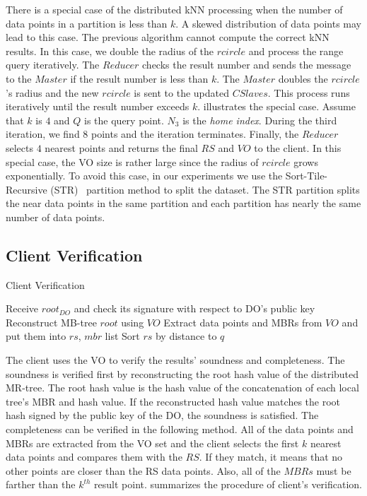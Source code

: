 There is a special case of the distributed kNN processing when the number of data points in a partition is less than $k$. A skewed distribution of data points may lead to this case. The previous algorithm cannot compute the correct kNN results. In this case, we double the radius of the $rcircle$ and process the range query iteratively. The $Reducer$ checks the result number and sends the message to the $Master$ if the result number is less than $k$. The $Master$ doubles the $rcircle$'s radius and the new $rcircle$ is sent to the updated $CSlaves$. This process runs iteratively until the result number exceeds $k$.  illustrates the special case. Assume that $k$ is $4$ and $Q$ is the query point. $N_{3}$ is the \emph{home index}. During the third iteration, we find $8$ points and the iteration terminates. Finally, the $Reducer$ selects $4$ nearest points and returns the final $RS$ and $VO$ to the client. In this special case, the VO size is rather large since the radius of $rcircle$ grows exponentially. To avoid this case, in our experiments we use the Sort-Tile-Recursive (STR)~\cite{10.1109/ICDE.1997.582015} partition method to split the dataset. The STR partition splits the near data points in the same partition and each partition has nearly the same number of data points.

\subsection{Client Verification}\label{sec:knn:client-verification}

\begin{algorithm}[t]
  \caption{Client Verification}\label{alg:knn:client-verification}
  Receive ${root}_{DO}$ and check its signature with respect to DO's public key\;
  Reconstruct MB-tree ${root}$ using $VO$\;
  Extract data points and MBRs from $VO$ and put them into $rs$, $mbr$ list\;
  Sort $rs$ by distance to $q$\;
  \;
\end{algorithm}

The client uses the VO to verify the results' soundness and completeness. The soundness is verified first by reconstructing the root hash value of the distributed MR-tree. The root hash value is the hash value of the concatenation of each local tree's MBR and hash value. If the reconstructed hash value matches the root hash signed by the public key of the DO, the soundness is satisfied. The completeness can be verified in the following method. All of the data points and MBRs are extracted from the VO set and the client selects the first $k$ nearest data points and compares them with the $RS$. If they match, it means that no other points are closer than the RS data points. Also, all of the $MBRs$ must be farther than the $k^{th}$ result point.  summarizes the procedure of client's verification.

